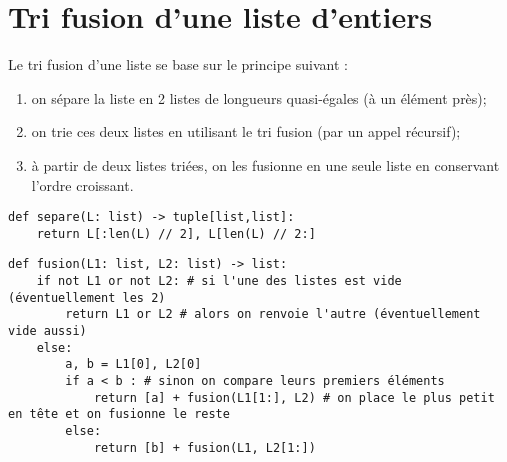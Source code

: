 \section*{Tri fusion d'une liste d'entiers}

Le tri fusion d'une liste se base sur le principe suivant : 
\begin{enumerate}
\item on sépare la liste en 2 listes de longueurs quasi-égales (à un élément près);
\item on trie ces deux listes en utilisant le tri fusion (par un appel récursif);
\item à partir de deux listes triées, on les fusionne en une seule liste en conservant l'ordre croissant.
\end{enumerate}

\ifprof
\begin{lstlisting}
def separe(L: list) -> tuple[list,list]:
    return L[:len(L) // 2], L[len(L) // 2:]
\end{lstlisting}
\else
\fi



\ifprof
\begin{lstlisting}
def fusion(L1: list, L2: list) -> list:
    if not L1 or not L2: # si l'une des listes est vide (éventuellement les 2)
        return L1 or L2 # alors on renvoie l'autre (éventuellement vide aussi)
    else:
        a, b = L1[0], L2[0] 
        if a < b : # sinon on compare leurs premiers éléments
            return [a] + fusion(L1[1:], L2) # on place le plus petit en tête et on fusionne le reste
        else:
            return [b] + fusion(L1, L2[1:])
\end{lstlisting}
\else
\fi

